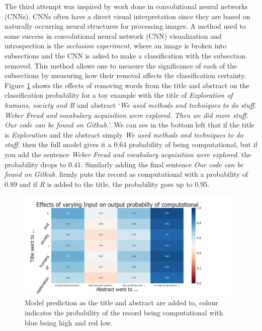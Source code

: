 \documentclass[12pt, a4paper]{article}
\begin{document}
The third attempt was inspired by work done in convolutional neural networks (CNNs). CNNs often have a direct visual interpretation since they are based on naturally occurring neural structures for processing images. A method used to some success in convolutional neural network (CNN) visualization and introspection is the \textit{occlusion experiment}, where an image is broken into subsections and the CNN is asked to make a classification with the subsection removed. This method allows one to measure the significance of each of the subsections by measuring how their removal affects the classification certainty. Figure \ref{oc1} shows the effects of removing words from the title and abstract on the classification probability for a toy example with the title of \textit{Exploration of humans, society and R} and abstract `\textit{We used methods and techniques to do stuff. Weber Freud and vocabulary acquisition were explored. Then we did more stuff. Our code can be found on Github.}'. We can see in the bottom left that if the title is \textit{Exploration} and the abstract simply \textit{We used methods and techniques to do stuff.} then the full model gives it a $0.64$ probability of being computational, but if you add the sentence \textit{Weber Freud and vocabulary acquisition were explored.} the probability drops to $0.41$. Similarly adding the final sentence \textit{Our code can be found on Github.} firmly puts the record as computational with a probability of $0.89$ and if \textit{R} is added to the title, the probability goes up to $0.95$.

\begin{figure}[ht]
	\centering
	\includegraphics[width=1\textwidth]{occ_example}
	\caption{Model prediction as the title and abstract are added to, colour indicates the probability of the record being computational with blue being high and red low.}\label{oc1}
\end{figure}
\end{document}
